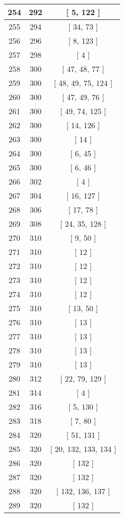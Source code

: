 \begin{center}
\begin{longtable}[H]{|| c c c ||}
\hline
254 & 292 & [ 5, 122 ] \\ 
\hline
255 & 294 & [ 34, 73 ] \\ 
\hline
256 & 296 & [ 8, 123 ] \\ 
\hline
257 & 298 & [ 4 ] \\ 
\hline
258 & 300 & [ 47, 48, 77 ] \\ 
\hline
259 & 300 & [ 48, 49, 75, 124 ] \\ 
\hline
260 & 300 & [ 47, 49, 76 ] \\ 
\hline
261 & 300 & [ 49, 74, 125 ] \\ 
\hline
262 & 300 & [ 14, 126 ] \\ 
\hline
263 & 300 & [ 14 ] \\ 
\hline
264 & 300 & [ 6, 45 ] \\ 
\hline
265 & 300 & [ 6, 46 ] \\ 
\hline
266 & 302 & [ 4 ] \\ 
\hline
267 & 304 & [ 16, 127 ] \\ 
\hline
268 & 306 & [ 17, 78 ] \\ 
\hline
269 & 308 & [ 24, 35, 128 ] \\ 
\hline
270 & 310 & [ 9, 50 ] \\ 
\hline
271 & 310 & [ 12 ] \\ 
\hline
272 & 310 & [ 12 ] \\ 
\hline
273 & 310 & [ 12 ] \\ 
\hline
274 & 310 & [ 12 ] \\ 
\hline
275 & 310 & [ 13, 50 ] \\ 
\hline
276 & 310 & [ 13 ] \\ 
\hline
277 & 310 & [ 13 ] \\ 
\hline
278 & 310 & [ 13 ] \\ 
\hline
279 & 310 & [ 13 ] \\ 
\hline
280 & 312 & [ 22, 79, 129 ] \\ 
\hline
281 & 314 & [ 4 ] \\ 
\hline
282 & 316 & [ 5, 130 ] \\ 
\hline
283 & 318 & [ 7, 80 ] \\ 
\hline
284 & 320 & [ 51, 131 ] \\ 
\hline
285 & 320 & [ 20, 132, 133, 134 ] \\ 
\hline
286 & 320 & [ 132 ] \\ 
\hline
287 & 320 & [ 132 ] \\ 
\hline
288 & 320 & [ 132, 136, 137 ] \\ 
\hline
289 & 320 & [ 132 ] \\ 

\end{longtable}
\end{center}
